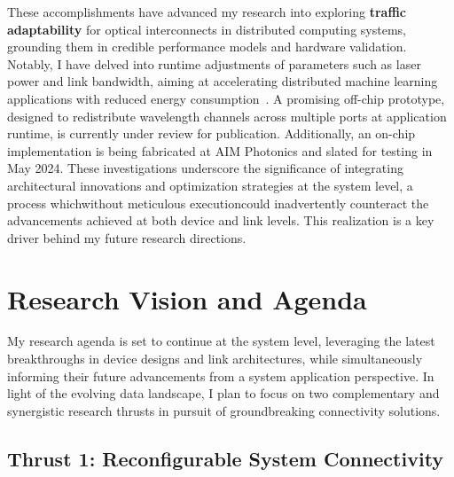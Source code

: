 These accomplishments have advanced my research into exploring \textbf{traffic adaptability} for optical interconnects in distributed computing systems, grounding them in credible performance models and hardware validation. Notably, I have delved into runtime adjustments of parameters such as laser power and link bandwidth, aiming at accelerating distributed machine learning applications with reduced energy consumption~\cite{wangTaskMappingAssistedLaser2019,wangTrafficAdaptivePowerReconfiguration2021,brianJOCN}. A promising off-chip prototype, designed to redistribute wavelength channels across multiple ports at application runtime, is currently under review for publication. Additionally, an on-chip implementation is being fabricated at AIM Photonics and slated for testing in May 2024. These investigations underscore the significance of integrating architectural innovations and optimization strategies at the system level, a process which\textemdash without meticulous execution\textemdash could inadvertently counteract the advancements achieved at both device and link levels. This realization is a key driver behind my future research directions.

\section{Research Vision and Agenda}
My research agenda is set to continue at the system level, leveraging the latest breakthroughs in device designs and link architectures, while simultaneously informing their future advancements from a system application perspective. In light of the evolving data landscape, I plan to focus on two complementary and synergistic research thrusts in pursuit of groundbreaking connectivity solutions.

\subsection{Thrust 1: Reconfigurable System Connectivity}

